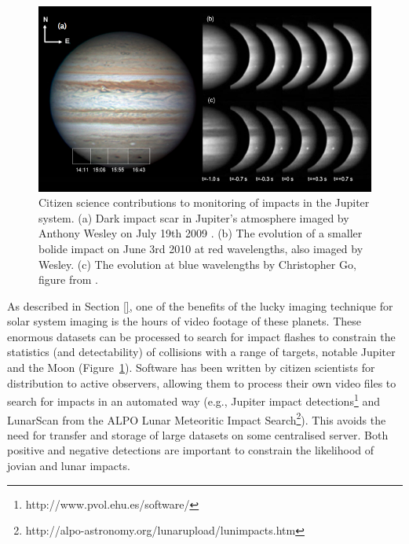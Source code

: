 \documentclass{ar2e}
\begin{document}
\begin{figure}[!ht]
\centering\includegraphics[width=\linewidth]{figs/jupiter-impacts.png}
\caption{Citizen science contributions to monitoring of impacts in the Jupiter
system. (a) Dark impact scar in Jupiter's atmosphere imaged by Anthony
Wesley on July 19th 2009 \citep{Sanchez-LavegaEtal2010}. (b) The
evolution of a smaller bolide impact on June 3rd 2010 at red
wavelengths, also imaged by Wesley. (c) The evolution at blue
wavelengths by Christopher Go, figure from \citet{HuesoEtal2010}.}
\label{fig:jupiter-impacts}
\end{figure}


As described in Section \ref{}, one of the benefits of the lucky imaging
technique for solar system imaging is the hours of video footage of these
planets.  These enormous datasets can be processed to search for impact
flashes to constrain the statistics (and detectability) of collisions with a
range of targets, notable Jupiter and the Moon
(Figure~\ref{fig:jupiter-impacts}).  Software has been written by
citizen scientists for distribution to active observers, allowing them to
process their own video files to search for impacts in an automated way (e.g.,
Jupiter impact detections\footnote{http://www.pvol.ehu.es/software/} and
LunarScan from the ALPO Lunar Meteoritic Impact
Search\footnote{http://alpo-astronomy.org/lunarupload/lunimpacts.htm}).  This
avoids the need for transfer and storage of large datasets on some centralised
server.  Both positive and negative detections are important to constrain the
likelihood of jovian and lunar impacts.
\end{document}
